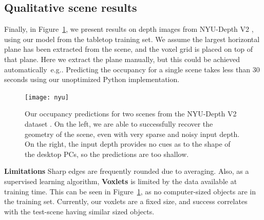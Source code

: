 \documentclass[10pt,twocolumn,letterpaper]{article}
\makeatletter
\renewcommand*{\eg}{e.g.\@\xspace}
\newcommand{\note}[1]{\textcolor{blue}{NOTE: #1}}
\renewcommand{\paragraph}{\vspace{2pt}\noindent\textbf}
\makeatother
\begin{document}
\subsection{Qualitative scene results}
Finally, in Figure~\ref{fig:nyu_results}, we present results on depth images from NYU-Depth V2 \cite{silberman-eccv-2012}, using our model from the tabletop training set.
We assume the largest horizontal plane has been extracted from the scene, and the voxel grid is placed on top of that plane.
Here we extract the plane manually, but this could be achieved automatically~\eg \cite{silberman-eccv-2012}.
Predicting the occupancy for a single scene takes less than 30 seconds using our unoptimized Python implementation.


\begin{figure}
    \vspace{-10pt}
  \texttt{[image: nyu]}
         \caption{Our occupancy predictions for two scenes from the NYU-Depth V2 dataset \cite{silberman-eccv-2012}. On the left, we are able to successfully recover the geometry of the scene, even with very sparse and noisy input depth.
On the right, the input depth provides no cues as to the shape of the desktop PCs, so the predictions are too shallow.}%
    \label{fig:nyu_results}
        \vspace{-12pt}
\end{figure}



\paragraph{Limitations}\newline
Sharp edges are frequently rounded due to averaging. Also, as a supervised learning algorithm, {\bf Voxlets} is limited by the data available at training time.
This can be seen in Figure~\ref{fig:nyu_results}, as no computer-sized objects are in the training set.
Currently, our voxlets are a fixed size, and success correlates with the test-scene having similar sized objects.


\end{document}
